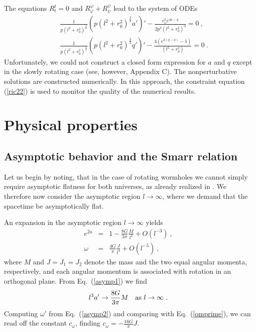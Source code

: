 \documentclass[showpacs,preprintnumbers,amsmath,amssymb,floatfix]{revtex4}
\newcommand{\vphi}{\varphi}
\begin{document}
The equations $R^t_t=0$ and $R^\vphi_\vphi+R^\psi_\psi$
lead to the system of ODEs
%
\begin{eqnarray}
& & 
\frac{1}{p (l^2+r_0^2)^{\frac{3}{2}}}
\left(p (l^2+r_0^2)^{\frac{3}{2}} a'\right)'
 -\frac{c_\omega^2 e^{4a-q}}{2 p^3(l^2+r_0^2)^4}  =0 \ ,
\label{eqa}\\
& & 
\frac{1}{p (l^2+r_0^2)^{\frac{3}{2}}}
\left(p (l^2+r_0^2)^{\frac{3}{2}} q'\right)'
 -\frac{4 \left(e^{2(q-a)}-1\right)}{(l^2+r_0^2)}  =0 \ .
\label{eqq} 
\end{eqnarray}
%
Unfortunately, we could not construct a closed form expression for $a$ and $q$
except in the slowly rotating case (see, however, Appendix C).
The nonperturbative solutions are constructed numerically.
In this approach, 
the constraint equation (\ref{ric22}) is used to monitor the quality of the
numerical results.

 
\section{Physical properties}


\subsection{Asymptotic behavior and the Smarr relation}

Let us begin by noting, that in the case of rotating  wormholes
we cannot simply require asymptotic flatness for both universes,
as already realized in \cite{Khatsymovsky:1998tv}.
We therefore now consider the asymptotic region $l \to \infty$,
where we demand that the spacetime be asymptotically flat.


An expansion in the asymptotic region $l \to \infty$ yields
%
\begin{eqnarray}
e^{2a} & = & 1 -\frac{8 G}{3 \pi} \frac{M}{l^2} + O(l^{-3}) \ , 
\label{asymp1} \\
\omega  & =  & \frac{4 G}{\pi} \frac{J}{l^4} + O(l^{-5}) \ ,  
\label{asymp2}
\end{eqnarray}
%
where $M$ and $J=J_1=J_2$ denote the mass and the two equal angular momenta,
respectively, and each angular momentum is associated with rotation in 
an orthogonal plane. From Eq.~(\ref{asymp1}) we find 
%
\begin{equation}
l^3 a' \to \frac{8 G}{3 \pi} M \ \ \ {\rm as} \ l \to \infty \ .
\label{atoinfty}
\end{equation}
%
Computing $\omega'$ from Eq.~(\ref{asymp2}) and comparing with 
Eq.~(\ref{omprime}), we can read off the constant $c_\omega$, finding
$c_\omega= -\frac{16 G}{\pi}J$.
\end{document}
